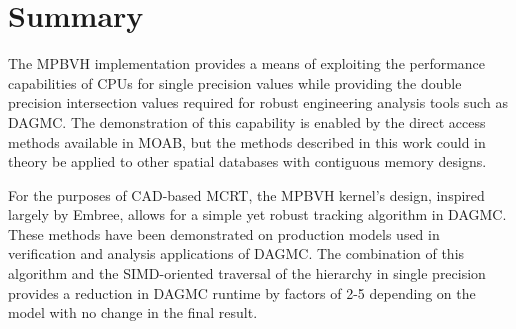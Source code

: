 \section{Summary}

The MPBVH implementation provides a means of exploiting the performance
capabilities of CPUs for single precision values while providing the double
precision intersection values required for robust engineering analysis tools
such as DAGMC. The demonstration of this capability is enabled by the direct
access methods available in MOAB, but the methods described in this work could
in theory be applied to other spatial databases with contiguous memory designs.

For the purposes of CAD-based MCRT, the MPBVH kernel's design, inspired largely
by Embree, allows for a simple yet robust tracking algorithm in DAGMC. These
methods have been demonstrated on production models used in verification and
analysis applications of DAGMC. The combination of this algorithm and the
SIMD-oriented traversal of the hierarchy in single precision provides a
reduction in DAGMC runtime by factors of 2-5 depending on the model with no
change in the final result.
